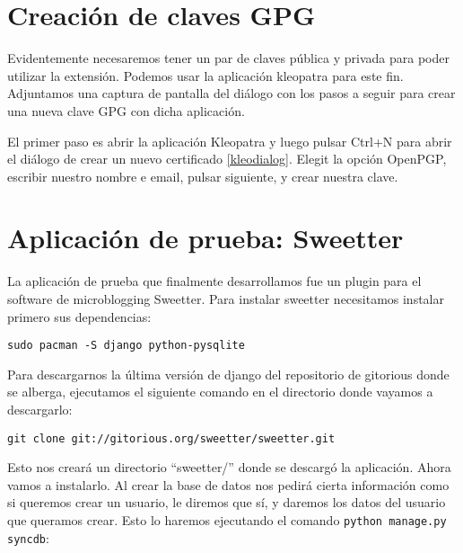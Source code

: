 \section{Creación de claves GPG}

Evidentemente necesaremos tener un par de claves pública y privada para poder utilizar la extensión. Podemos usar la aplicación kleopatra para este fin. Adjuntamos una captura de pantalla del diálogo con los pasos a seguir para crear una nueva clave GPG con dicha aplicación.


El primer paso es abrir la aplicación Kleopatra y luego pulsar Ctrl+N para abrir el diálogo de crear un nuevo certificado \ref{kleodialog}. Elegit la opción OpenPGP, escribir nuestro nombre e email, pulsar siguiente, y crear nuestra clave.

\section{Aplicación de prueba: Sweetter}

La aplicación de prueba que finalmente desarrollamos fue un plugin para el software de microblogging Sweetter. Para instalar sweetter necesitamos instalar primero sus dependencias:

\begin{verbatim}
sudo pacman -S django python-pysqlite
\end{verbatim} 

Para descargarnos la última versión de django del repositorio de gitorious donde se alberga, ejecutamos el siguiente comando en el directorio donde vayamos a descargarlo:

\begin{verbatim}
git clone git://gitorious.org/sweetter/sweetter.git
\end{verbatim}

Esto nos creará un directorio ``sweetter/'' donde se descargó la aplicación. Ahora vamos a instalarlo. Al crear la base de datos nos pedirá cierta información como si queremos crear un usuario, le diremos que sí, y daremos los datos del usuario que queramos crear. Esto lo haremos ejecutando el comando \verb|python manage.py syncdb|:

